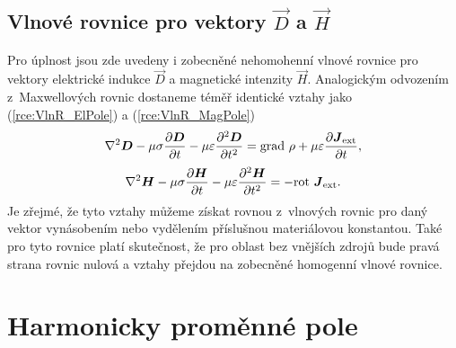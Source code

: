 \subsection*{Vlnové rovnice pro vektory $\vec D$ a $\vec H$}
Pro úplnost jsou zde uvedeny i zobecněné nehomohenní vlnové rovnice pro vektory elektrické indukce $\vec D$ a magnetické intenzity $\vec H$. Analogickým odvozením z~Maxwellových rovnic dostaneme téměř identické vztahy jako (\ref{rce:VlnR_ElPole}) a (\ref{rce:VlnR_MagPole}) 
\begin{displaymath}
	\nabla^{2}\mbox{\boldmath$D$} -\mu\sigma\frac{\partial\mbox{\boldmath$D$}}{\partial t}-\mu\varepsilon\frac{\partial^{2}\mbox{\boldmath$D$}}{\partial t^{2}} = \mathrm{grad}\ \rho + \mu\varepsilon\frac{\partial\mbox{\boldmath$J$}_{\mathrm{ext}}}{\partial t},
\end{displaymath}
\begin{displaymath}
	\nabla^{2}\mbox{\boldmath$H$} -\mu\sigma\frac{\partial\mbox{\boldmath$H$}}{\partial t}-\mu\varepsilon\frac{\partial^{2}\mbox{\boldmath$H$}}{\partial t^{2}}= -\mathrm{rot}\ \mbox{\boldmath$J$}_{\mathrm{ext}}.
\end{displaymath}
Je zřejmé, že tyto vztahy můžeme získat rovnou z~vlnových rovnic pro daný vektor vynásobením nebo vydělením příslušnou materiálovou konstantou. Také pro tyto rovnice platí skutečnost, že pro oblast bez vnějších zdrojů bude pravá strana rovnic nulová a vztahy přejdou na zobecněné homogenní vlnové rovnice.

\section{Harmonicky proměnné pole} \label{sec:Odvozeni_HarmPole}

